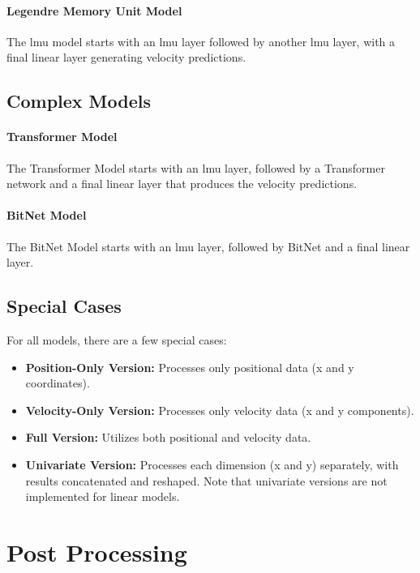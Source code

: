 \paragraph{Legendre Memory Unit Model}
The \gls{lmu} model starts with an \gls{lmu} layer followed by another \gls{lmu} layer, with a final linear layer generating velocity predictions.

\subsection{Complex Models}

\paragraph{Transformer Model}
The Transformer Model starts with an \gls{lmu} layer, followed by a Transformer network and a final linear layer that produces the velocity predictions.

\paragraph{BitNet Model}
The BitNet Model starts with an \gls{lmu} layer, followed by BitNet and a final linear layer.

\subsection{Special Cases}
For all models, there are a few special cases:

\begin{itemize}
    \item \textbf{Position-Only Version:} Processes only positional data (x and y coordinates).
    \item \textbf{Velocity-Only Version:} Processes only velocity data (x and y components).
    \item \textbf{Full Version:} Utilizes both positional and velocity data.
    \item \textbf{Univariate Version:} Processes each dimension (x and y) separately, with results concatenated and reshaped. Note that univariate versions are not implemented for linear models.
\end{itemize}


\section{Post Processing}
\label{sec:postprocessing}

